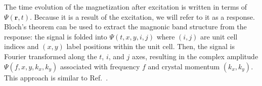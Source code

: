 \documentclass[aps,prx,twocolumn,superscriptaddress,floatfix]{revtex4-2}
\begin{document}
The time evolution of the magnetization after excitation is written in terms of $\Psi(\mathbf{r},t)$. Because it is a result of the excitation, we will refer to it as a response. Bloch's theorem can be used to extract the magnonic band structure from the response: the signal is folded into $\Psi(t,x,y,i,j)$ where $(i,j)$ are unit cell indices and $(x,y)$ label positions within the unit cell. Then, the signal is Fourier transformed along the $t$, $i$, and $j$ axes, resulting in the complex amplitude $\Psi(f,x,y,k_x,k_y)$ associated with frequency $f$ and crystal momentum $(k_x,k_y)$. This approach is similar to Ref.~. %
\end{document}
